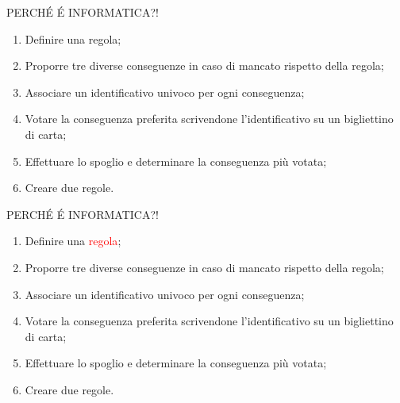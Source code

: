 \documentclass[aspectratio=1610]{beamer}
\begin{document}
\begin{frame}{PERCH\'E \'E INFORMATICA?!}
    \begin{enumerate}
        \item Definire una regola;
        \item Proporre tre diverse conseguenze in caso di mancato rispetto della regola;
        \item Associare un identificativo univoco per ogni conseguenza;
        \item Votare la conseguenza preferita scrivendone l'identificativo su un bigliettino di carta;
        \item Effettuare lo spoglio e determinare la conseguenza più votata;
        \item Creare due regole.
    \end{enumerate}
\end{frame}

\begin{frame}{PERCH\'E \'E INFORMATICA?!}
    \begin{enumerate}
        \item Definire una \textcolor{red}{regola};
        \item Proporre tre diverse conseguenze in caso di mancato rispetto della regola;
        \item Associare un identificativo univoco per ogni conseguenza;
        \item Votare la conseguenza preferita scrivendone l'identificativo su un bigliettino di carta;
        \item Effettuare lo spoglio e determinare la conseguenza più votata;
        \item Creare due regole.
    \end{enumerate}
\end{frame}
\end{document}
